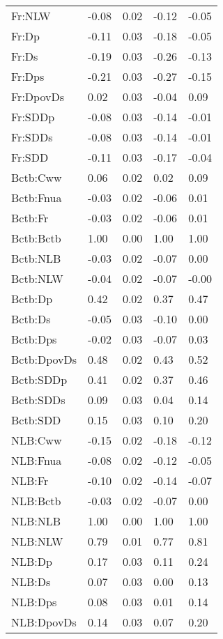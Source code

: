 \begin{center}
\begin{longtable}{|p{0.9in}|p{0.7in}|p{0.7in}|p{0.7in}|p{0.7in}|}
  Fr:NLW & -0.08 & 0.02 & -0.12 & -0.05 \\ 
  Fr:Dp & -0.11 & 0.03 & -0.18 & -0.05 \\ 
  Fr:Ds & -0.19 & 0.03 & -0.26 & -0.13 \\ 
  Fr:Dps & -0.21 & 0.03 & -0.27 & -0.15 \\ 
  Fr:DpovDs & 0.02 & 0.03 & -0.04 & 0.09 \\ 
  Fr:SDDp & -0.08 & 0.03 & -0.14 & -0.01 \\ 
  Fr:SDDs & -0.08 & 0.03 & -0.14 & -0.01 \\ 
  Fr:SDD & -0.11 & 0.03 & -0.17 & -0.04 \\ 
  Bctb:Cww & 0.06 & 0.02 & 0.02 & 0.09 \\ 
  Bctb:Fnua & -0.03 & 0.02 & -0.06 & 0.01 \\ 
  Bctb:Fr & -0.03 & 0.02 & -0.06 & 0.01 \\ 
  Bctb:Bctb & 1.00 & 0.00 & 1.00 & 1.00 \\ 
  Bctb:NLB & -0.03 & 0.02 & -0.07 & 0.00 \\ 
  Bctb:NLW & -0.04 & 0.02 & -0.07 & -0.00 \\ 
  Bctb:Dp & 0.42 & 0.02 & 0.37 & 0.47 \\ 
  Bctb:Ds & -0.05 & 0.03 & -0.10 & 0.00 \\ 
  Bctb:Dps & -0.02 & 0.03 & -0.07 & 0.03 \\ 
  Bctb:DpovDs & 0.48 & 0.02 & 0.43 & 0.52 \\ 
  Bctb:SDDp & 0.41 & 0.02 & 0.37 & 0.46 \\ 
  Bctb:SDDs & 0.09 & 0.03 & 0.04 & 0.14 \\ 
  Bctb:SDD & 0.15 & 0.03 & 0.10 & 0.20 \\ 
  NLB:Cww & -0.15 & 0.02 & -0.18 & -0.12 \\ 
  NLB:Fnua & -0.08 & 0.02 & -0.12 & -0.05 \\ 
  NLB:Fr & -0.10 & 0.02 & -0.14 & -0.07 \\ 
  NLB:Bctb & -0.03 & 0.02 & -0.07 & 0.00 \\ 
  NLB:NLB & 1.00 & 0.00 & 1.00 & 1.00 \\ 
  NLB:NLW & 0.79 & 0.01 & 0.77 & 0.81 \\ 
  NLB:Dp & 0.17 & 0.03 & 0.11 & 0.24 \\ 
  NLB:Ds & 0.07 & 0.03 & 0.00 & 0.13 \\ 
  NLB:Dps & 0.08 & 0.03 & 0.01 & 0.14 \\ 
  NLB:DpovDs & 0.14 & 0.03 & 0.07 & 0.20 \\ 

\end{longtable}
\end{center}
